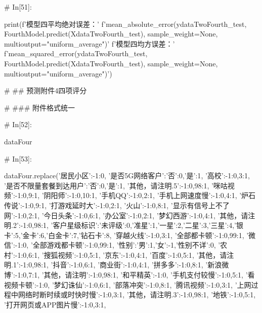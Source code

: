 \documentclass{MathorCupmodeling}
\begin{document}
\begin{python}
# In[51]:


print(f'模型四平均绝对误差：'
      f'{mean_absolute_error(ydataTwoFourth_test, FourthModel.predict(XdataTwoFourth_test), sample_weight=None, multioutput="uniform_average")}\n'
      f'模型四均方误差：'
      f'{mean_squared_error(ydataTwoFourth_test, FourthModel.predict(XdataTwoFourth_test), sample_weight=None, multioutput="uniform_average")}')


# ## 预测附件4四项评分

# ### 附件格式统一

# In[52]:


dataFour


# In[53]:


dataFour.replace({'居民小区':{-1:0},
                 '是否5G网络客户':{'否':0,'是':1},
                 '高校':{-1:0,3:1},
                 '是否不限量套餐到达用户':{'否':0,'是':1},
                 '其他，请注明.5':{-1:0,98:1},
                 '咪咕视频':{-1:0,9:1},
                 '阴阳师':{-1:0,10:1},
                 '手机QQ':{-1:0,2:1},
                 '手机上网速度慢':{-1:0,4:1},
                 '炉石传说':{-1:0,9:1},
                 '打游戏延时大':{-1:0,2:1},
                 '火山':{-1:0,8:1},
                 '显示有信号上不了网':{-1:0,2:1},
                 '今日头条':{-1:0,6:1},
                 '办公室':{-1:0,2:1},
                 '梦幻西游':{-1:0,4:1},
                 '其他，请注明.2':{-1:0,98:1},
                 '客户星级标识':{'未评级':0,'准星':1,'一星':2,'二星':3,'三星':4,'银卡':5,'金卡':6,'白金卡':7,'钻石卡':8},
                 '穿越火线':{-1:0,3:1},
                 '全部都卡顿':{-1:0,99:1},
                 '微信':{-1:0},
                 '全部游戏都卡顿':{-1:0,99:1},
                 '性别':{'男':1,'女':-1,'性别不详':0},
                 '农村':{-1:0,6:1},
                 '搜狐视频':{-1:0,5:1},
                 '京东':{-1:0,4:1},
                 '百度':{-1:0,5:1},
                 '其他，请注明.1':{-1:0,98:1},
                 '抖音':{-1:0,6:1},
                 '商业街':{-1:0,4:1},
                 '拼多多':{-1:0,8:1},
                 '新浪微博':{-1:0,7:1},
                 '其他，请注明':{-1:0,98:1},
                 '和平精英':{-1:0},
                 '手机支付较慢':{-1:0,5:1},
                 '看视频卡顿':{-1:0},
                 '梦幻诛仙':{-1:0,6:1},
                 '部落冲突':{-1:0,8:1},
                 '腾讯视频':{-1:0,3:1},
                 '上网过程中网络时断时续或时快时慢':{-1:0,3:1},
                 '其他，请注明.3':{-1:0,98:1},
                 '地铁':{-1:0,5:1},
                 '打开网页或APP图片慢':{-1:0,3:1},
}
\end{python}
\end{document}

